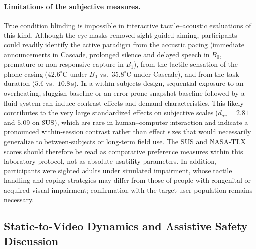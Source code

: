 \documentclass[final,5p,times,twocolumn,authoryear]{elsarticle}
\begin{document}
\paragraph{Limitations of the subjective measures.}
True condition blinding is impossible in interactive tactile--acoustic evaluations of this kind. Although the eye masks removed sight-guided aiming, participants could readily identify the active paradigm from the acoustic pacing (immediate announcements in Cascade, prolonged silence and delayed speech in $B_0$, premature or non-responsive capture in $B_1$), from the tactile sensation of the phone casing ($42.6^\circ\text{C}$ under $B_0$ vs.\ $35.8^\circ\text{C}$ under Cascade), and from the task duration ($5.6$ vs.\ $10.8$\,s). In a within-subjects design, sequential exposure to an overheating, sluggish baseline or an error-prone snapshot baseline followed by a fluid system can induce contrast effects and demand characteristics. This likely contributes to the very large standardized effects on subjective scales ($d_{av} = 2.81$ and $5.09$ on SUS), which are rare in human--computer interaction and indicate a pronounced within-session contrast rather than effect sizes that would necessarily generalize to between-subjects or long-term field use. The SUS and NASA-TLX scores should therefore be read as comparative preference measures within this laboratory protocol, not as absolute usability parameters. In addition, participants were sighted adults under simulated impairment, whose tactile handling and coping strategies may differ from those of people with congenital or acquired visual impairment; confirmation with the target user population remains necessary.

\subsection{Static-to-Video Dynamics and Assistive Safety Discussion}
\label{subsec:discussion}
\end{document}
